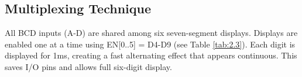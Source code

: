 \subsection{Multiplexing Technique}
All BCD inputs (A-D) are shared among six seven-segment displays. Displays are enabled one at a time using EN[0..5] = D4-D9 (see Table \ref{tab:2.3}). Each digit is displayed for 1ms, creating a fast alternating effect that appears continuous. This saves I/O pins and allows full six-digit display.


